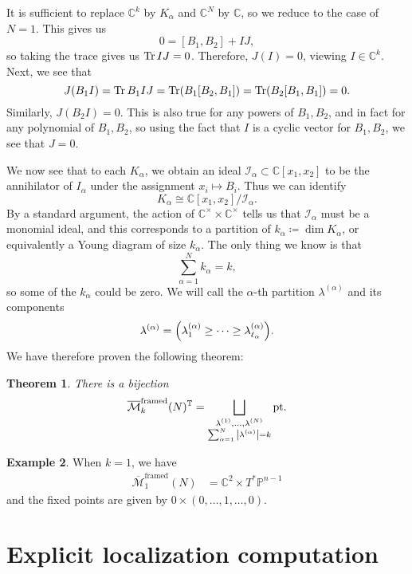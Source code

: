 \documentclass[leqno, openany]{memoir}
\newtheorem{thm}{Theorem}[section]
\theoremstyle{definition}
\newtheorem{exm}[thm]{Example}
\theoremstyle{remark}
\theoremstyle{plain}
\theoremstyle{definition}
\theoremstyle{remark}
\newcommand{\C}{\mathbb{C}}
\renewcommand{\P}{\mathbb{P}}
\newcommand{\mc}[1]{\mathcal{#1}}
\newcommand{\T}{\mathbb{T}}
\newcommand{\mr}[1]{\mathrm{#1}}
\newcommand{\ol}[1]{\overline{#1}}
\begin{document}
It is sufficient to replace $\C^k$ by $K_{\alpha}$ and $\C^N$ by $\C$, so we reduce to the case of $N=1$. This gives us
\[ 0 = [B_1, B_2] + IJ, \]
so taking the trace gives us $\Tr IJ = 0$. Therefore, $J(I) = 0$, viewing $I \in \C^k$. Next, we see that 
\[ J(B_1 I) = \Tr B_1 IJ = \Tr (B_1 [B_2, B_1]) = \Tr (B_2[B_1, B_1]) = 0. \]
Similarly, $J(B_2 I) = 0$. This is also true for any powers of $B_1, B_2$, and in fact for any polynomial of $B_1, B_2$, so using the fact that $I$ is a cyclic vector for $B_1, B_2$, we see that $J=0$.

We now see that to each $K_{\alpha}$, we obtain an ideal $\mc{I}_{\alpha} \subset \C[x_1, x_2]$ to be the annihilator of $I_{\alpha}$ under the assignment $x_i \mapsto B_i$. Thus we can identify
\[ K_{\alpha} \cong \C[x_1, x_2] / \mc{I}_{\alpha}. \]
By a standard argument, the action of $\C^{\times} \times \C^{\times}$ tells us that $\mc{I}_{\alpha}$ must be a monomial ideal, and this corresponds to a partition of $k_{\alpha} \coloneqq \dim K_{\alpha}$, or equivalently a Young diagram of size $k_{\alpha}$. The only thing we know is that
\[ \sum_{\alpha = 1}^N k_{\alpha} = k, \]
so some of the $k_{\alpha}$ could be zero. We will call the $\alpha$-th partition $\lambda^{(\alpha)}$ and its components
\[ \lambda^{(\alpha)} = \qty(\lambda_1^{(\alpha)} \geq \cdots \geq \lambda_{\ell_{\alpha}}^{(\alpha)}). \]
We have therefore proven the following theorem:

\begin{thm}
    There is a bijection 
    \[ \ol{\mc{M}}_k^{\mr{framed}}(N)^{\T} = \bigsqcup_{\substack{\lambda^{(1)}, \ldots, \lambda^{(N)} \\ \sum_{\alpha=1}^N \abs{\lambda^{(\alpha)}} = k}} \mr{pt}. \]
\end{thm}

\begin{exm}
    When $k=1$, we have
    \begin{align*}
        \ol{\mc{M}}_1^{\mr{framed}}(N) &= \C^2 \times T^* \P^{n-1}
    \end{align*}
    and the fixed points are given by $\qty{0} \times (0,\ldots,1,\ldots,0)$.
\end{exm}

\section{Explicit localization computation}%
\label{sec:Explicit localization computation}
\end{document}
